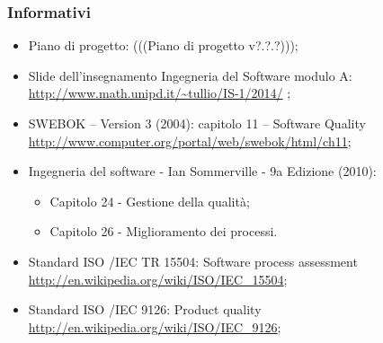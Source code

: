 \subsubsection{Informativi}
\begin{itemize}
\item Piano di progetto: (((Piano di progetto v?.?.?)));
\item Slide dell’insegnamento Ingegneria del Software modulo A:\\
\url{http://www.math.unipd.it/~tullio/IS-1/2014/} ;
\item SWEBOK – Version 3 (2004): capitolo 11 – Software Quality\\
\url{http://www.computer.org/portal/web/swebok/html/ch11};
\item Ingegneria del software - Ian Sommerville - 9a Edizione (2010):
\begin{itemize}
	\item Capitolo 24 - Gestione della qualità;
	\item Capitolo 26 - Miglioramento dei processi.
\end{itemize}
\item Standard ISO /IEC TR 15504: Software process assessment\\ \url{http://en.wikipedia.org/wiki/ISO/IEC_15504};
\item Standard ISO /IEC 9126: Product quality\\ \url{http://en.wikipedia.org/wiki/ISO/IEC_9126};
\end{itemize}
